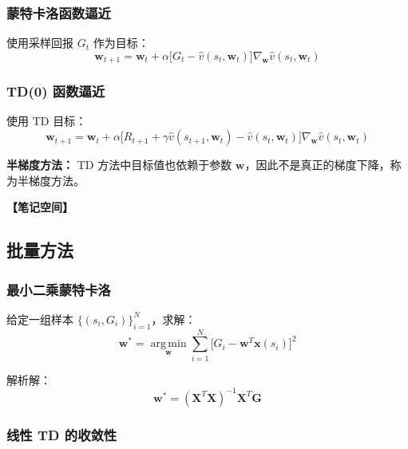 \documentclass[12pt,a4paper]{article}
\newcommand{\notespace}[1][3cm]{%
  \vspace{#1}%
  \noindent\textbf{【笔记空间】}%
  \vspace{#1}%
}
\newcommand{\1}{\mathbf{1}}
\newcommand{\argmin}{\operatorname*{arg\,min}}
\begin{document}
\subsubsection*{蒙特卡洛函数逼近}

使用采样回报 $G_t$ 作为目标：
\begin{equation}
\mathbf{w}_{t+1}=\mathbf{w}_t+\alpha\bigl[G_t-\hat{v}(s_t,\mathbf{w}_t)\bigr]\nabla_{\mathbf{w}}\hat{v}(s_t,\mathbf{w}_t)
\end{equation}

\subsubsection*{TD(0) 函数逼近}

使用 TD 目标：
\begin{equation}
\mathbf{w}_{t+1}=\mathbf{w}_t+\alpha\bigl[R_{t+1}+\gamma\hat{v}(s_{t+1},\mathbf{w}_t)-\hat{v}(s_t,\mathbf{w}_t)\bigr]\nabla_{\mathbf{w}}\hat{v}(s_t,\mathbf{w}_t)
\end{equation}

\begin{notebox}
\textbf{半梯度方法：} TD 方法中目标值也依赖于参数 $\mathbf{w}$，因此不是真正的梯度下降，称为半梯度方法。
\end{notebox}

\notespace[2cm]

\subsection{批量方法}

\subsubsection*{最小二乘蒙特卡洛}

给定一组样本 $\{(s_i,G_i)\}_{i=1}^{N}$，求解：
\begin{equation}
\mathbf{w}^*=\argmin_{\mathbf{w}}\sum_{i=1}^{N}\bigl[G_i-\mathbf{w}^T\mathbf{x}(s_i)\bigr]^2
\end{equation}

解析解：
\begin{equation}
\mathbf{w}^*=(\mathbf{X}^T\mathbf{X})^{-1}\mathbf{X}^T\mathbf{G}
\end{equation}

\subsubsection*{线性 TD 的收敛性}
\end{document}
